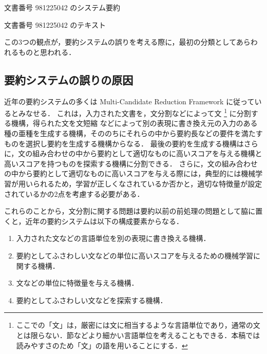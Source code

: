 \begin{table}[b]
\caption{文書番号 981225042 のシステム要約}
\label{tb:文書番号981225042のシステム要約}

\end{table}

\begin{table}[t]
\caption{文書番号 981225042 のテキスト}
\label{tb:文書番号981225042のテキスト}

\end{table}

この3つの観点が，要約システムの誤りを考える際に，最初の分類としてあらわれるものと思われる．


\subsection{要約システムの誤りの原因}
\label{要約システムの誤りの原因}

近年の要約システムの多くは Multi-Candidate Reduction Framework \cite{zajic07,jurafsky08} に従っているとみなせる．
これは，入力された文書を，文分割などによって文 \footnote{ここでの「文」は，厳密には文に相当するような言語単位であり，通常の文とは限らない．節などより細かい言語単位を考えることもできる．本稿では読みやすさのため「文」の語を用いることにする．} に分割する機構\cite{gillick09a}，得られた文を文短縮 \cite{jing00,knight02}などによって別の表現に書き換え元の入力のある種の亜種を生成する機構，そののちにそれらの中から要約長などの要件を満たすものを選択し要約を生成する機構からなる\cite{filatova04,mcdonald07}．
最後の要約を生成する機構はさらに，文の組み合わせの中から要約として適切なものに高いスコアを与える機構と高いスコアを持つものを探索する機構に分割できる．
さらに，文の組み合わせの中から要約として適切なものに高いスコアを与える際には，典型的には機械学習が用いられるため，学習が正しくなされているか否かと，適切な特徴量が設定されているかの2点を考慮する必要がある．

これらのことから，文分割に関する問題は要約以前の前処理の問題として脇に置くと，近年の要約システムは以下の構成要素からなる．

\begin{enumerate}
\item 入力された文などの言語単位を別の表現に書き換える機構．
\item 要約としてふさわしい文などの単位に高いスコアを与えるための機械学習に関する機構．
\item 文などの単位に特徴量を与える機構．
\item 要約としてふさわしい文などを探索する機構．
\end{enumerate}

